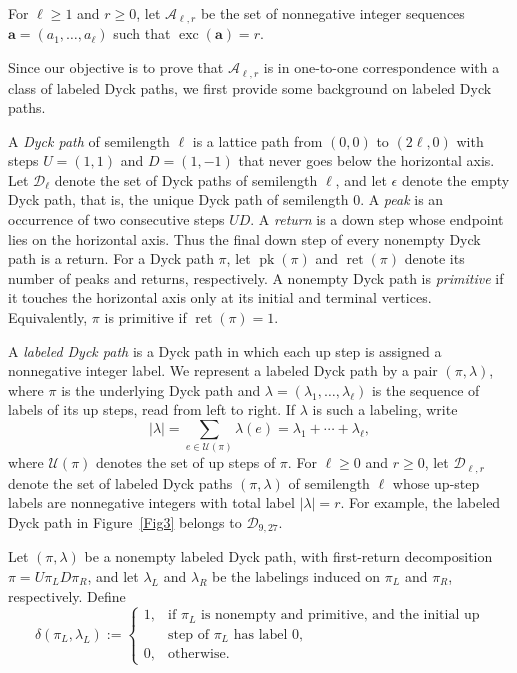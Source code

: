 \documentclass[12pt]{amsart}
\theoremstyle{plain}
\theoremstyle{definition}
\DeclareMathOperator{\pk}{pk}
\DeclareMathOperator{\ret}{ret}
\begin{document}
For $\ell\geq 1$ and $r\geq 0$, let $\mathcal{A}_{\ell,r}$ be the set
of nonnegative integer sequences $\mathbf{a}=(a_1,\ldots,a_\ell)$ such that $\operatorname{exc}(\mathbf{a})=r$.

Since our objective is to prove that $\mathcal{A}_{\ell,r}$ is in one-to-one correspondence with a class of labeled Dyck paths, we first provide some background on labeled Dyck paths.

A \emph{Dyck path} of semilength $\ell$ is a lattice path from $(0,0)$ to $(2\ell,0)$ with steps $U=(1,1)$ and $D=(1,-1)$ that never goes below the horizontal axis. Let $\mathcal{D}_\ell$ denote the set of Dyck paths of semilength $\ell$, and let $\epsilon$ denote the empty Dyck path, that is, the unique Dyck path of semilength $0$. A \emph{peak} is an occurrence of two consecutive steps $UD$. A \emph{return} is a down step whose endpoint lies on the horizontal axis. Thus the final down step of every nonempty Dyck path is a return. For a Dyck path $\pi$, let $\pk(\pi)$ and $\ret(\pi)$ denote its number of peaks and returns, respectively. A nonempty Dyck path is \emph{primitive} if it touches the horizontal axis only at its initial and terminal vertices. Equivalently, $\pi$ is primitive if $\ret(\pi)=1$. 

A \emph{labeled Dyck path} is a Dyck path in which each up step is assigned a nonnegative integer label. We represent a labeled Dyck path by a pair
$(\pi,\lambda)$, where $\pi$ is the underlying Dyck path and $\lambda=(\lambda_1,\ldots,\lambda_\ell)$ is the sequence of labels of its up steps, read from left to right. If $\lambda$ is such a labeling, write
\[
|\lambda|
=
\sum_{e\in\mathcal{U}(\pi)}\lambda(e)=\lambda_1+\cdots +\lambda_\ell,
\] 
where $\mathcal{U}(\pi)$ denotes the set of up steps of $\pi$. 
For $\ell\geq 0$ and $r\geq 0$, let $\mathcal{D}_{\ell,r}$ denote the set of
labeled Dyck paths $(\pi,\lambda)$ of semilength $\ell$ whose up-step labels
are nonnegative integers with total label $|\lambda|=r$. For example,
the labeled Dyck path in Figure~\ref{Fig3} belongs to
$\mathcal{D}_{9,27}$.

Let $(\pi,\lambda)$ be a nonempty labeled Dyck path, with first-return decomposition  $\pi=U\pi_LD\pi_R$, and let $\lambda_L$ and $\lambda_R$ be the labelings induced on $\pi_L$ and $\pi_R$, respectively. Define 
\[ \delta(\pi_L,\lambda_L):= \begin{cases} 1, &\text{if $\pi_L$ is nonempty and primitive, and the initial up}\\ &\text{step of $\pi_L$ has label $0$},\\ 0, &\text{otherwise}. \end{cases} \]
\end{document}
